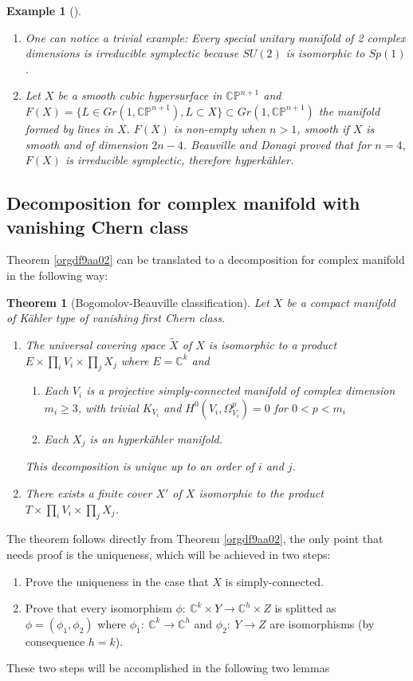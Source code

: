 \documentclass[11pt]{article}
\newtheorem{theorem}{Theorem}
\newtheorem{exampl}{Example}
\begin{document}
\begin{exampl}[]
\begin{enumerate}
\item One can notice a trivial example: Every special unitary manifold of 2 complex dimensions is
irreducible symplectic because \(SU(2)\) is isomorphic to \(Sp(1)\).
\item Let \(X\) be a smooth cubic hypersurface in \(\mathbb{C}\mathbb{P}^{n+1}\) and \(F(X)= \{ L \in Gr(1,
   \mathbb{C}\mathbb{P}^{n+1}) , L \subset X\} \subset Gr(1, \mathbb{C}\mathbb{P}^{n+1})\) the
manifold formed by lines in \(X\). \(F(X)\) is non-empty when \(n>1\), smooth if \(X\) is smooth and of
dimension \(2n-4\). Beauville and Donagi proved that for \(n=4\), \(F(X)\) is irreducible symplectic,
therefore hyperkähler.
\end{enumerate}
\end{exampl}
\subsection{Decomposition for complex manifold with vanishing Chern class}
\label{sec:org6b838e2}

Theorem \ref{orgdf9aa02} can be translated to a decomposition for complex manifold in the following
way:
\begin{theorem}[Bogomolov-Beauville classification]
\label{thm:beauville-2}
\label{orgb6cc487}
Let \(X\) be a compact manifold of Kähler type of vanishing first Chern class.
\begin{enumerate}
\item The universal covering space \(\tilde X\) of \(X\) is isomorphic to a product \(E\times \prod_i
   V_i\times\prod_j X_j\) where \(E = \mathbb{C}^k\) and
\begin{enumerate}
\item Each \(V_i\) is a projective simply-connected manifold of complex dimension \(m_i\geq 3\), with trivial
\(K_{V_i}\) and \(H^0(V_i,\Omega_{V_i}^p) = 0\) for \(0 < p < m_i\)
\item Each \(X_j\) is an hyperkähler manifold.
\end{enumerate}
This decomposition is unique up to an order of \(i\) and \(j\).
\item There exists a finite cover \(X'\) of \(X\) isomorphic to the product \(T\times\prod_i
   V_i\times\prod_j X_j\).
\end{enumerate}
\end{theorem}
The theorem follows directly from Theorem \ref{orgdf9aa02}, the only point that needs proof is the
uniqueness, which will be achieved in two steps:
\begin{enumerate}
\item Prove the uniqueness in the case that \(X\) is simply-connected.
\item Prove that every isomorphism \(\phi:\ \mathbb{C}^k\times Y\longrightarrow \mathbb{C}^h\times Z\) is
splitted as \(\phi = (\phi_1,\phi_2)\) where \(\phi_1:\ \mathbb{C}^k\longrightarrow \mathbb{C}^h\) and
\(\phi_2:\ Y\longrightarrow Z\) are isomorphisms (by consequence \(h=k\)).
\end{enumerate}
These two steps will be accomplished in the following two lemmas
\end{document}
